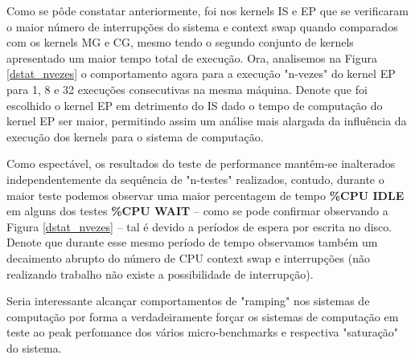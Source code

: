 \documentclass[conference,compsoc]{IEEEtran}
\begin{document}
Como se pôde constatar anteriormente, foi nos kernels IS e EP que se verificaram o maior número de interrupções do sistema e context swap quando comparados com os kernels MG e CG, mesmo tendo o segundo conjunto de kernels apresentado um maior tempo total de execução. Ora, analisemos na Figura \ref{dstat_nvezes}
 o comportamento agora para a execução "n-vezes" do kernel EP para 1, 8 e 32 execuções consecutivas na mesma máquina. Denote que foi escolhido o kernel EP em detrimento do IS dado o tempo de computação do kernel EP ser maior, permitindo assim um análise mais alargada da influência da execução dos kernels para o sistema de computação.\par 
 Como espectável, os resultados do teste de performance mantêm-se inalterados independentemente da sequência de "n-testes" realizados, contudo, durante o maior teste podemos observar uma maior percentagem de tempo \textbf{\%CPU IDLE} em alguns dos testes  \textbf{\%CPU WAIT} -- como se pode confirmar observando a Figura  \ref{dstat_nvezes} --
 tal é devido a períodos de espera por escrita no disco. Denote que durante esse mesmo período de tempo observamos também  um decaimento abrupto do número de CPU context swap e interrupções (não realizando trabalho não existe a possibilidade de interrupção).\par 
 Seria interessante alcançar comportamentos de "ramping" nos sistemas de computação por forma a verdadeiramente forçar os sistemas de computação em teste ao peak perfomance dos vários micro-benchmarks e respectiva "saturação" do sistema.
\end{document}
